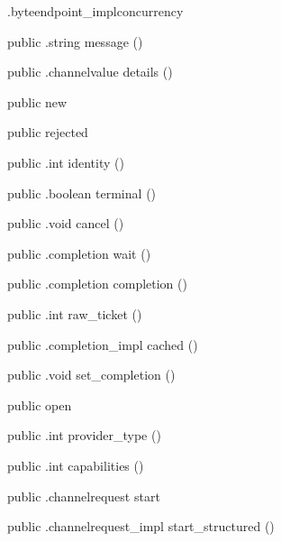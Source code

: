 \begin{CrexxClass}{.byteendpoint\_impl}{concurrency}
\begin{Members}
    \Method
      {public}
      {.string}
      {message}
      {()}

    \Method
      {public}
      {.channelvalue}
      {details}
      {()}

    \Factory
      {public}
      {new}
      {}

    \Factory
      {public}
      {rejected}
      {}

    \Method
      {public}
      {.int}
      {identity}
      {()}

    \Method
      {public}
      {.boolean}
      {terminal}
      {()}

    \Method
      {public}
      {.void}
      {cancel}
      {()}

    \Method
      {public}
      {.completion}
      {wait}
      {()}

    \Method
      {public}
      {.completion}
      {completion}
      {()}

    \Method
      {public}
      {.int}
      {raw\_ticket}
      {()}

    \Method
      {public}
      {.completion\_impl}
      {cached}
      {()}

    \Method
      {public}
      {.void}
      {set\_completion}
      {()}

    \Factory
      {public}
      {open}
      {}

    \Method
      {public}
      {.int}
      {provider\_type}
      {()}

    \Method
      {public}
      {.int}
      {capabilities}
      {()}

    \Method
      {public}
      {.channelrequest}
      {start}
      {}

    \Method
      {public}
      {.channelrequest\_impl}
      {start\_structured}
      {()}


\end{Members}
\end{CrexxClass}
